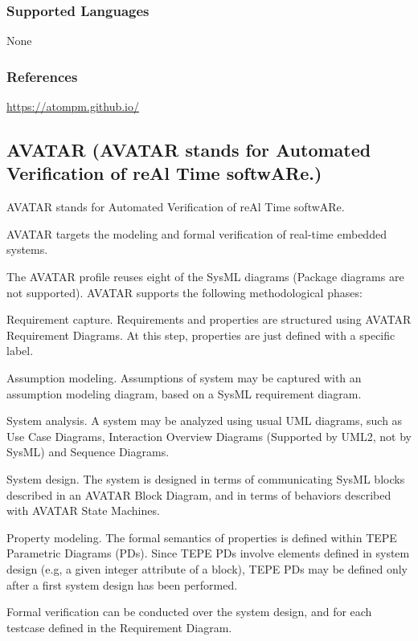 \subsubsection{Supported Languages}

None


\subsubsection{References}

\url{https://atompm.github.io/}



\subsection{AVATAR (AVATAR stands for Automated Verification of reAl Time softwARe.)}
\label{subsecT:AVATAR}

AVATAR stands for Automated Verification of reAl Time softwARe.

AVATAR targets the modeling and formal verification of real-time embedded systems.

The AVATAR profile reuses eight of the SysML diagrams (Package diagrams are not supported). AVATAR supports the following methodological phases:

    Requirement capture. Requirements and properties are structured using AVATAR Requirement Diagrams. At this step, properties are just defined with a specific label.

    Assumption modeling. Assumptions of system may be captured with an assumption modeling diagram, based on a SysML requirement diagram.

    System analysis. A system may be analyzed using usual UML diagrams, such as Use Case Diagrams, Interaction Overview Diagrams (Supported by UML2, not by SysML) and Sequence Diagrams.

    System design. The system is designed in terms of communicating SysML blocks described in an AVATAR Block Diagram, and in terms of behaviors described with AVATAR State Machines.

    Property modeling. The formal semantics of properties is defined within TEPE Parametric Diagrams (PDs). Since TEPE PDs involve elements defined in system design (e.g, a given integer attribute of a block), TEPE PDs may be defined only after a first system design has been performed.

    Formal verification can be conducted over the system design, and for each testcase defined in the Requirement Diagram.

